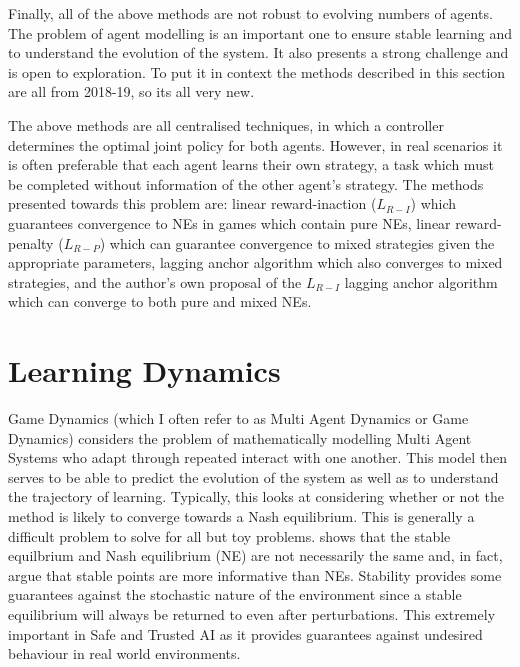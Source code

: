 \documentclass[../sample.tex]{subfiles}
\begin{document}
Finally, all of the above methods are not robust to evolving numbers of agents. The problem of agent
modelling is an important one to ensure stable learning and to understand the evolution of the
system. It also presents a strong challenge and is open to exploration. To put it in context the
methods described in this section are all from 2018-19, so its all very new.

The above methods are all centralised techniques, in which a controller determines the optimal joint
policy for both agents. However, in real scenarios it is often preferable that each agent learns
their own strategy, a task which must be completed without information of the other agent's
strategy. The methods presented towards this problem are: linear reward-inaction ($L_{R-I}$) which
guarantees convergence to NEs in games which contain pure NEs, linear reward-penalty ($L_{R-P}$)
which can guarantee convergence to mixed strategies given the appropriate parameters, lagging anchor
algorithm which also converges to mixed strategies, and the author's own proposal of the $L_{R-I}$
lagging anchor algorithm which can converge to both pure and mixed NEs.


\section{Learning Dynamics}

Game Dynamics (which I often refer to as Multi Agent Dynamics or Game Dynamics) considers the
problem of mathematically modelling Multi Agent Systems who adapt through repeated interact with one
another. This model then serves to be able to predict the evolution of the system as well as to
understand the trajectory of learning. Typically, this looks at considering whether or not the
method is likely to converge towards a Nash equilibrium. This is generally a difficult problem to
solve \cite{ShohamMultiagentFoundations} for all but toy problems.
\cite{Letcher2019DifferentiableMechanics} shows that the stable equilbrium and Nash equilibrium (NE)
are not necessarily the same and, in fact, argue that stable points are more informative than NEs.
Stability provides some guarantees against the stochastic nature of the environment since a stable
equilibrium will always be returned to even after perturbations. This extremely important in Safe
and Trusted AI as it provides guarantees against undesired behaviour in real world environments.
\end{document}
